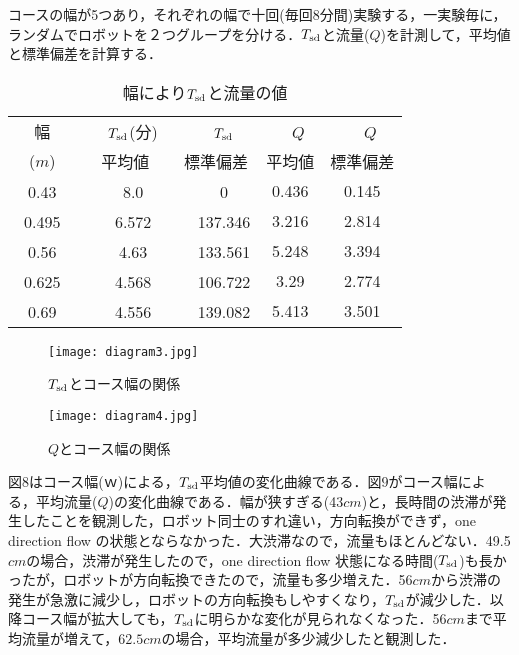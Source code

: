 コースの幅が5つあり，それぞれの幅で十回(毎回8分間)実験する，一実験毎に，ランダムでロボットを２つグループを分ける．$T_{\rm sd}$と流量($Q$)を計測して，平均値と標準偏差を計算する．
\begin{table}[!ht]
\setlength\tabcolsep{1pt}
\begin{center}
\begin{tabular}{|c|c|c|c|c|}
\hline
幅　&　$T_{\rm sd}$(分)　&　$T_{\rm sd}$　&　$Q$　&　$Q$　\\
($m$)   &   平均値 & 標準偏差 & 平均値 & 標準偏差 \\
\hline
0.43　&　8.0　&　0 & 0.436 & 0.145 \\
\hline
0.495　&　6.572　&　137.346 & 3.216 & 2.814 \\
\hline
0.56　&　4.63　&　133.561 & 5.248 & 3.394 \\
\hline
0.625　&　4.568　&　106.722 & 3.29 & 2.774 \\
\hline
0.69　&　4.556　&　139.082 & 5.413 & 3.501 \\
\hline
\end{tabular}
\end{center}
\caption{
幅により$T_{\rm sd}$と流量の値
}
\end{table}
\vspace{-6mm}
\begin{figure}[!ht]
    \centering
    \texttt{[image: diagram3.jpg]}
    \caption{$T_{\rm sd}$とコース幅の関係}
\end{figure}
\vspace{-6mm}
\begin{figure}[!ht]
    \centering
    \texttt{[image: diagram4.jpg]}
    \caption{$Q$とコース幅の関係}
\end{figure}

図$8$はコース幅($ｗ$)による，$T_{\rm sd}$平均値の変化曲線である．図$9$がコース幅による，平均流量($Q$)の変化曲線である．幅が狭すぎる(43$cm$)と，長時間の渋滞が発生したことを観測した，ロボット同士のすれ違い，方向転換ができず，one direction flow の状態とならなかった．大渋滞なので，流量もほとんどない．49.5$cm$の場合，渋滞が発生したので，one direction flow 状態になる時間($T_{\rm sd}$)も長かったが，ロボットが方向転換できたので，流量も多少増えた．56$cm$から渋滞の発生が急激に減少し，ロボットの方向転換もしやすくなり，$T_{\rm sd}$が減少した．以降コース幅が拡大しても，$T_{\rm sd}$に明らかな変化が見られなくなった．56$cm$まで平均流量が増えて，$62.5cm$の場合，平均流量が多少減少したと観測した．

